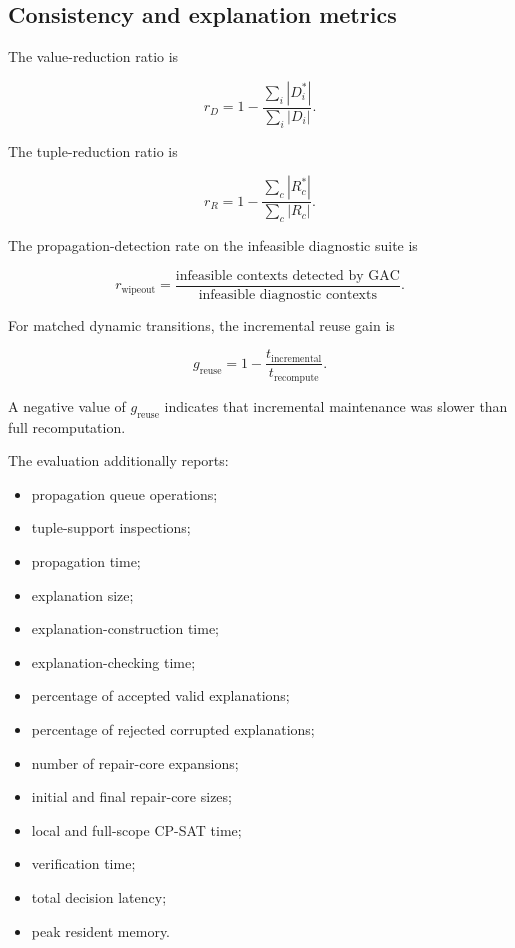 \documentclass[pdflatex,sn-mathphys-num,iicol,oneside]{sn-jnl}
\begin{document}
\subsection{Consistency and explanation metrics}

The value-reduction ratio is

\begin{equation}
r_D
=
1-
\frac{
\sum_i |D_i^{*}|
}{
\sum_i |D_i|
}.
\label{eq:value-reduction}
\end{equation}

The tuple-reduction ratio is

\begin{equation}
r_R
=
1-
\frac{
\sum_c |R_c^{*}|
}{
\sum_c |R_c|}
.
\label{eq:tuple-reduction}
\end{equation}

The propagation-detection rate on the infeasible diagnostic suite is

\begin{equation}
r_{\mathrm{wipeout}}
=
\frac{
\text{infeasible contexts detected by GAC}
}{
\text{infeasible diagnostic contexts}
}.
\end{equation}

For matched dynamic transitions, the incremental reuse gain is

\begin{equation}
g_{\mathrm{reuse}}
=
1-
\frac{
t_{\mathrm{incremental}}
}{
t_{\mathrm{recompute}}
}.
\label{eq:reuse-gain}
\end{equation}

A negative value of $g_{\mathrm{reuse}}$ indicates that incremental
maintenance was slower than full recomputation.

The evaluation additionally reports:

\begin{itemize}
    \item propagation queue operations;
    \item tuple-support inspections;
    \item propagation time;
    \item explanation size;
    \item explanation-construction time;
    \item explanation-checking time;
    \item percentage of accepted valid explanations;
    \item percentage of rejected corrupted explanations;
    \item number of repair-core expansions;
    \item initial and final repair-core sizes;
    \item local and full-scope CP-SAT time;
    \item verification time;
    \item total decision latency;
    \item peak resident memory.
\end{itemize}
\end{document}
